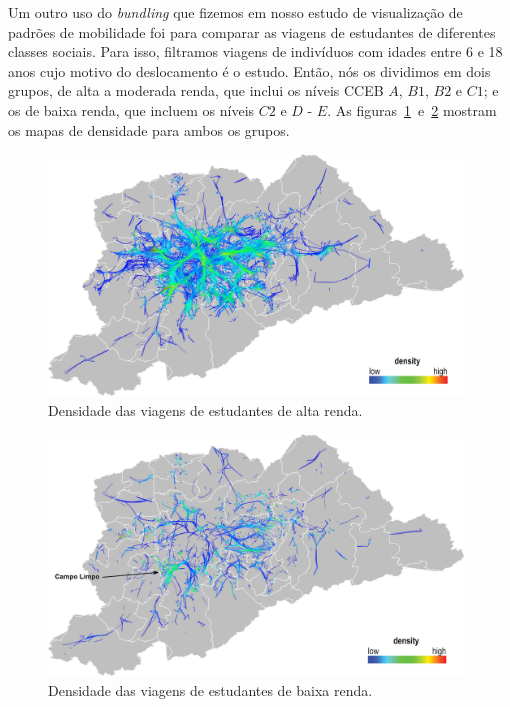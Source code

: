 Um outro uso do \emph{bundling} que fizemos em nosso estudo de visualização de padrões de
mobilidade foi para comparar as viagens de estudantes de diferentes classes
sociais. Para isso, filtramos viagens de indivíduos com idades entre 6 e 18 anos
cujo motivo do deslocamento é o estudo. Então, nós os dividimos em dois grupos,
de alta a moderada renda, que inclui os níveis CCEB $A$, $B1$, $B2$ e $C1$; e os
de baixa renda, que incluem os níveis $C2$ e $D$ - $E$. As
figuras~\ref{fig:students-high}~e~\ref{fig:students-low} mostram os mapas de
densidade para ambos os grupos.

\begin{figure}[!htb]
  \centering
  \captionsetup{justification=centering}
  \includegraphics[width=0.98\textwidth]{../figuras/high-income-density-leg.png}
  \caption{Densidade das viagens de estudantes de alta renda. \label{fig:students-high}}
\end{figure}
\vspace*{\floatsep}
\begin{figure}[!htb]
  \centering
  \captionsetup{justification=centering}
  \includegraphics[width=0.98\textwidth]{../figuras/low-income-density-leg.png}
  \caption{Densidade das viagens de estudantes de baixa renda. \label{fig:students-low}}
\end{figure}

